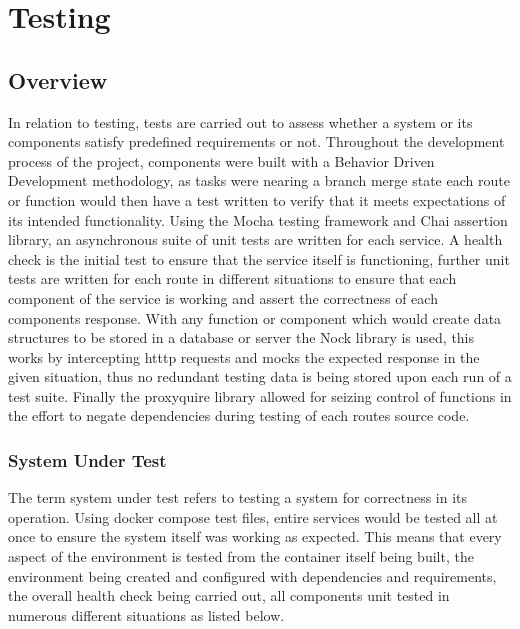 \section{Testing}
	\subsection{Overview}
    In relation to testing, tests are carried out to assess whether a system or its components satisfy predefined requirements or not\cite{testingwiki}. Throughout the development process of the project, components were built with a Behavior Driven Development methodology, as tasks were nearing a branch merge state each route or function would then have a test written to verify that it meets expectations of its intended functionality. Using the Mocha testing framework and Chai assertion library, an asynchronous suite of unit tests are written for each service\cite{mocha}\cite{chai}. A health check is the initial test to ensure that the service itself is functioning, further unit tests are written for each route in different situations to ensure that each component of the service is working and assert the correctness of each components response\cite{mocha}\cite{chai}. With any function or component which would create data structures to be stored in a database or server the Nock library is used, this works by intercepting htttp requests and mocks the expected response in the given situation, thus no redundant testing data is being stored upon each run of a test suite\cite{nock}. Finally the proxyquire library allowed for seizing control of functions in the effort to negate dependencies during testing of each routes source code\cite{thlorenz}.
    \subsubsection{System Under Test}
    The term system under test refers to testing a system for correctness in its operation. Using docker compose test files, entire services would be tested all at once to ensure the system itself was working as expected. This means that every aspect of the environment is tested from the container itself being built, the environment being created and configured with dependencies and requirements, the overall health check being carried out, all components unit tested in numerous different situations as listed below.
    

